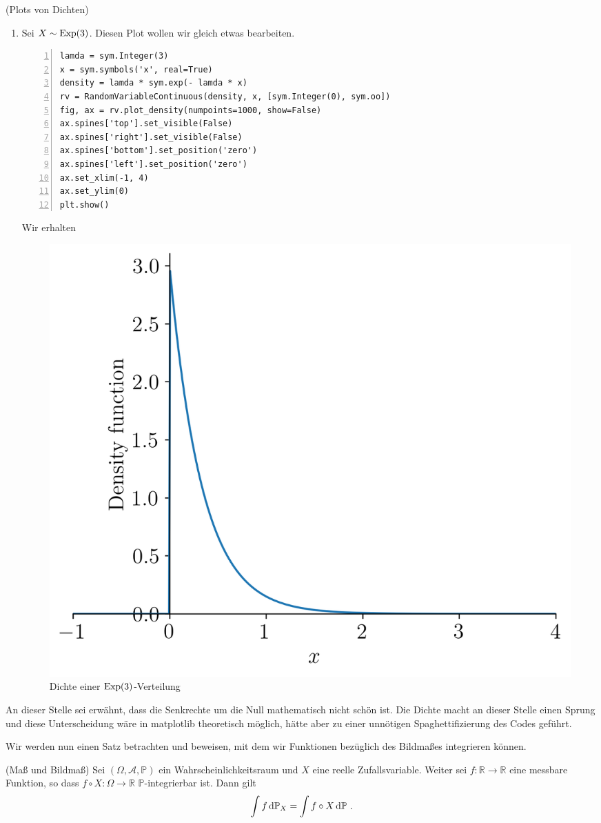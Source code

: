 \begin{Beispiel}{(Plots von Dichten)}
\begin{enumerate}[label=(\roman*)]
\item Sei $X \sim \operatorname{Exp}(3)$. Diesen Plot wollen wir gleich etwas bearbeiten.
\begin{lstlisting}[numbers=left, numberstyle=\tiny\color{codegray}]
lamda = sym.Integer(3)
x = sym.symbols('x', real=True)
density = lamda * sym.exp(- lamda * x)
rv = RandomVariableContinuous(density, x, [sym.Integer(0), sym.oo])
fig, ax = rv.plot_density(numpoints=1000, show=False)
ax.spines['top'].set_visible(False)
ax.spines['right'].set_visible(False)
ax.spines['bottom'].set_position('zero')
ax.spines['left'].set_position('zero')
ax.set_xlim(-1, 4)
ax.set_ylim(0)
plt.show()
\end{lstlisting}
Wir erhalten
\begin{figure}[H]
\centering
\includegraphics[width=0.5\linewidth]{./Section/Grundlegende Begriffe/Dichte Exponential.png}
\caption{Dichte einer $\operatorname{Exp}(3)$-Verteilung}
\end{figure}
\end{enumerate}
An dieser Stelle sei erwähnt, dass die Senkrechte um die Null mathematisch nicht schön ist. Die Dichte macht an dieser Stelle einen Sprung und diese Unterscheidung wäre in matplotlib theoretisch möglich, hätte aber zu einer unnötigen Spaghettifizierung des Codes geführt.
\end{Beispiel}

\newpage

Wir werden nun einen Satz betrachten und beweisen, mit dem wir Funktionen bezüglich des Bildmaßes integrieren können.

\begin{Satz}{(Maß und Bildmaß)}
\hypertarget{Satz:Maß_und_Bildmaß}{}Sei $(\Omega, \mathscr{A}, \mathbb{P})$ ein Wahrscheinlichkeitsraum und $X$ eine reelle Zufallsvariable. Weiter sei $f: \mathbb{R} \rightarrow \mathbb{R}$ eine messbare Funktion, so dass $f \circ X: \Omega \rightarrow \mathbb{R}$ $\mathbb{P}$-integrierbar ist. Dann gilt
\[\int f \mathop{}\!\mathrm{d} \mathbb{P}_X = \int f \circ X \mathop{}\!\mathrm{d} \mathbb{P}~.\]
\end{Satz}

